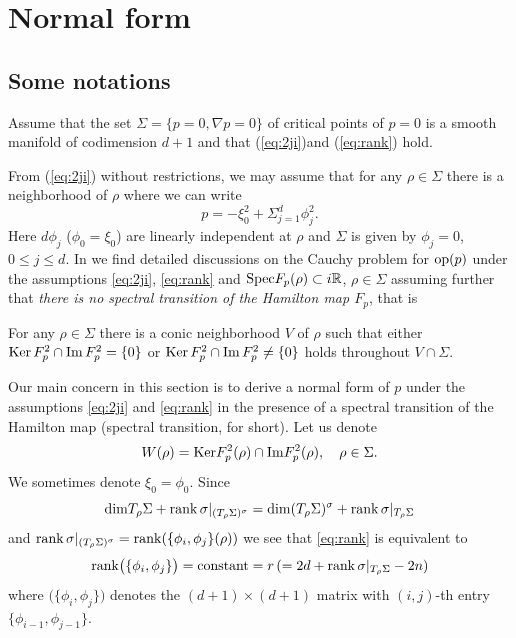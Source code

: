 \documentclass[12pt,leqno]{article} %
\def\R{{\mathbb R}}
\def\R{\mathbb{R}}
\numberwithin{equation}{section}
\begin{document}
\section{Normal form}
\label{nf1}
\subsection{Some notations}
\label{ssnot}
Assume that the set $\Sigma=\{p=0, \nabla p=0\}$ of critical points of
$p=0$ is a smooth manifold of codimension $d+1$ and that
(\ref{eq:2ji})and (\ref{eq:rank}) hold.

From (\ref{eq:2ji}) without restrictions, we may assume that for any $\rho\in\Sigma$ there is a neighborhood of $\rho$ where  we can write 
%
\[
p=-\xi_0^2+\Sigma_{j=1}^d\phi_j^2.
\]
%
Here $d\phi_j$ ($\phi_0=\xi_0$) are linearly independent at $\rho$ and $\Sigma$ is given by $\phi_j=0$, $0\leq j\leq d$. 
In \cite{MR3726883} we find detailed discussions on the Cauchy problem for ${\rm op}(p)$ under the assumptions \eqref{eq:2ji}, \eqref{eq:rank} and $
{\rm Spec}F_p(\rho)\subset i\R$, $ \rho\in\Sigma$ 
assuming further that {\it there is no spectral transition of the
  Hamilton map $F_p$}, that is

\medskip
\noindent
For any $\rho\in \Sigma$ there is a conic neighborhood $V$ of $\rho$ such that either ${\rm Ker\,}F_p^2\cap{\rm Im\,}F_p^2=\{0\}$ or ${\rm Ker\,}F_p^2\cap{\rm Im\,}F_p^2\neq \{0\}$ holds throughout $V\cap\Sigma$. 


\medskip
\noindent
%
%
Our main concern in this section is to derive a normal form of $p$ under the assumptions \eqref{eq:2ji} and \eqref{eq:rank} in the presence of a spectral transition of the Hamilton map (spectral transition, for short). Let us denote
%
\[
W(\rho)={\rm Ker}F_p^2(\rho)\cap{\rm Im}F_p^2(\rho),\quad \rho\in \Sigma.
\]
%
We sometimes denote $\xi_0=\phi_0$. Since
%
\[
{\rm dim}T_{\rho}\Sigma+{\rm rank}\,\sigma|_{(T_{\rho}\Sigma)^{\sigma}}={\rm dim}(T_{\rho}\Sigma)^{\sigma}+{\rm rank}\,\sigma|_{T_{\rho}\Sigma}
\]
%
and ${\rm rank}\,\sigma|_{(T_{\rho}\Sigma)^{\sigma}}={\rm rank}(\{\phi_i,\phi_j\}(\rho))$ we see that \eqref{eq:rank} is equivalent to
%
\begin{equation}
\label{eq:kaisu}
{\rm rank}\big(\{\phi_i,\phi_j\}\big)={\rm constant}=r\, (=2d+{\rm rank}\,\sigma|_{T_{\rho}\Sigma}-2n)
\end{equation}
%
where $\big(\{\phi_i,\phi_j\}\big)$ denotes the $(d+1)\times(d+1)$ matrix with $(i,j)$-th entry $\{\phi_{i-1},\phi_{j-1}\}$. 
\end{document}
